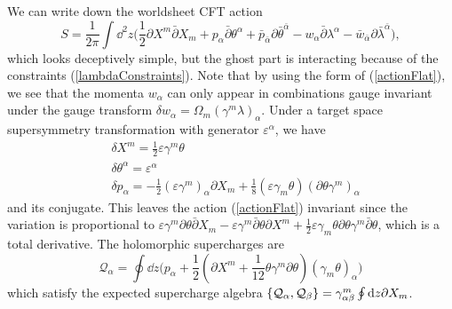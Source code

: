 \documentclass[12pt]{article}
\def\be{\begin{equation}}
\def\ee{\end{equation}}
\numberwithin{equation}{section}
\begin{document}
We can write down the worldsheet CFT action
\be
\label{actionFlat}
S = \frac{1}{2\pi} \int \dd^2 z \big(\frac{1}{2}\partial X^m \bar{\partial} X_m + p_\alpha \bar{\partial} \theta^\alpha + \bar{p}_{\bar{\alpha}} \partial \bar{\theta}^{\bar{\alpha}} - w_\alpha \bar{\partial} \lambda^\alpha - \bar{w}_{\bar{\alpha}} \partial \bar{\lambda}^{\bar{\alpha}}\big),
\ee
which looks deceptively simple, but the ghost part is interacting because of the constraints (\ref{lambdaConstraints}). Note that by using the form of (\ref{actionFlat}), we see that the momenta $w_\alpha$ can only appear in combinations gauge invariant under the gauge transform $\delta w_\alpha = \Omega_m (\gamma^m \lambda)_\alpha$.
Under a target space supersymmetry transformation with generator $\varepsilon^\alpha$, we have
\begin{align}
	&\delta X^m = \frac{1}{2} \varepsilon \gamma^m \theta  \\
	& \delta \theta^\alpha = \varepsilon^\alpha \\
	& \delta p_\alpha = -\frac{1}{2} (\varepsilon \gamma^m)_\alpha \partial X_m + \frac{1}{8} (\varepsilon \gamma_m \theta)(\partial \theta \gamma^m)_\alpha
\end{align}
and its conjugate. This leaves the action (\ref{actionFlat}) invariant since the variation is proportional to $\varepsilon \gamma^m \partial \theta \bar{\partial} X_m - \varepsilon \gamma^m \bar{\partial}\theta \partial X^m + \frac{1}{2} \varepsilon \gamma_m \theta \partial \theta \gamma^m \bar{\partial}\theta$, which is a total derivative. The holomorphic supercharges are
\be
\mathcal{Q}_\alpha = \oint \dd z \big( p_\alpha + \frac{1}{2}(\partial X^m + \frac{1}{12} \theta \gamma^m \partial \theta)(\gamma_m \theta)_\alpha \big)
\ee
which satisfy the expected supercharge algebra $\acomm{\mathcal{Q}_\alpha}{\mathcal{Q}_\beta} = \gamma^m_{\alpha \beta} \oint \dd z \partial X_m$.
\end{document}
